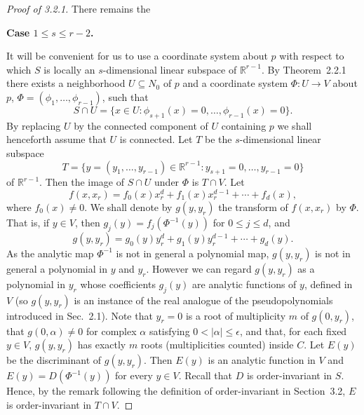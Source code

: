 \documentclass[11pt]{article}
\theoremstyle{plain}
\theoremstyle{definition}
\newcommand{\R}{\mathbb{R}}
\begin{document}
\begin{proof}[Proof of 3.2.1]
There remains the

\medskip
\noindent \textbf{Case $1 \le s \le r-2$.}
\medskip

It will be convenient for us to use a coordinate system about $p$ with
respect to which $S$ is locally an $s$-dimensional linear subspace of
$\R^{r-1}$. By Theorem~2.2.1 there exists a neighborhood
$U \subseteq N_0$ of $p$ and a coordinate system $\Phi : U \to V$
about $p$, $\Phi = (\phi_1, \ldots, \phi_{r-1})$, such that
\[
S \cap U = \{ x \in U : \phi_{s+1}(x) = 0, \ldots, \phi_{r-1}(x) = 0 \}.
\]
By replacing $U$ by the connected component of $U$ containing $p$ we
shall henceforth assume that $U$ is connected. Let $T$ be the
$s$-dimensional linear subspace
\[
T = \{ y = (y_1, \ldots, y_{r-1}) \in \R^{r-1} :
y_{s+1} = 0, \ldots, y_{r-1} = 0 \}
\]
of $\R^{r-1}$. Then the image of $S \cap U$ under $\Phi$ is
$T \cap V$. Let
\[
f(x, x_r) = f_0(x) x_r^d + f_1(x) x_r^{d-1} + \cdots + f_d(x),
\]
where $f_0(x) \ne 0$. We shall denote by $g(y, y_r)$ the transform of
$f(x, x_r)$ by $\Phi$. That is, if $y \in V$, then
$g_j(y) = f_j(\Phi^{-1}(y))$ for $0 \le j \le d$, and
\[
g(y, y_r) = g_0(y) y_r^d + g_1(y) y_r^{d-1} + \cdots + g_d(y).
\]
As the analytic map $\Phi^{-1}$ is not in general a polynomial map,
$g(y, y_r)$ is not in general a polynomial in $y$ and $y_r$. However
we can regard $g(y, y_r)$ as a polynomial in $y_r$ whose coefficients
$g_j(y)$ are analytic functions of $y$, defined in $V$ (so
$g(y, y_r)$ is an instance of the real analogue of the
pseudopolynomials introduced in Sec.~2.1). Note that $y_r = 0$ is a
root of multiplicity $m$ of $g(0, y_r)$, that $g(0, \alpha) \ne 0$ for
complex $\alpha$ satisfying $0 < |\alpha| \le \epsilon$, and that,
for each fixed $y \in V$, $g(y, y_r)$ has exactly $m$ roots
(multiplicities counted) inside $C$. Let $E(y)$ be the discriminant
of $g(y, y_r)$. Then $E(y)$ is an analytic function in $V$ and
$E(y) = D(\Phi^{-1}(y))$ for every $y \in V$. Recall that $D$ is
order-invariant in $S$. Hence, by the remark following the definition
of order-invariant in Section~3.2, $E$ is order-invariant in
$T \cap V$.


\end{proof}
\end{document}
